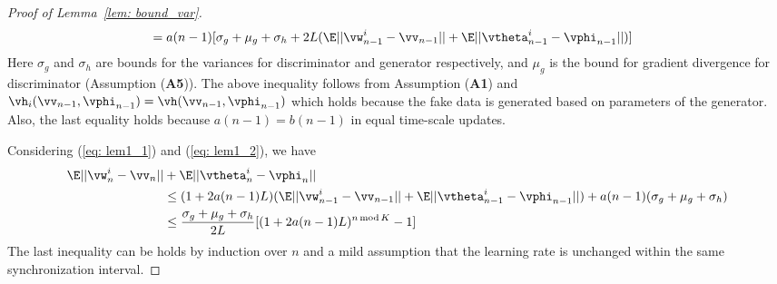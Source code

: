 \documentclass{article}
\def\lemref#1{Lemma~\ref{#1}}
\begin{document}
\begin{proof}	[Proof of \lemref{lem: bound_var}]
\begin{equation}
\begin{split}
		&=a(n-1)[\sigma_g+\mu_g+\sigma_h+ 2L(\E||\vw^i_{n-1}-\vv_{n-1}|| + \E||\vtheta^i_{n-1}-\vphi_{n-1}||)]
		\end{split}
		\end{equation}	
		Here $\sigma_g$ and $\sigma_h$ are bounds for the variances for discriminator and generator respectively, and $\mu_g$ is the bound for gradient divergence for discriminator (Assumption (\textbf{A5})). The above inequality follows from Assumption (\textbf{A1}) and  $\vh_i(\vv_{n-1},\vphi_{n-1})=\vh(\vv_{n-1},\vphi_{n-1})$ which holds because the fake data is generated based on parameters of the generator. Also, the last equality holds because $a(n-1)=b(n-1)$ in equal time-scale updates.
		
		Considering (\ref{eq: lem1_1}) and (\ref{eq: lem1_2}), we have
		\begin{equation}
		\begin{split}
		\E ||\vw^i_n-\vv_n||&+\E||\vtheta^i_n-\vphi_n||\\
		&\leq (1+2a(n-1)L)(\E||\vw^i_{n-1}-\vv_{n-1}|| + \E||\vtheta^i_{n-1}-\vphi_{n-1}||)+a(n-1)(\sigma_g+\mu_g+\sigma_h)\\
		&\leq \frac{\sigma_g+\mu_g+\sigma_h}{2L}[(1+2a(n-1)L)^{n\, \text{mod}\, K}-1]
		\end{split}
		\end{equation}
		The last inequality can be holds by induction over $n$ and a mild assumption that the learning rate is unchanged within the same synchronization interval. 
	\end{proof}
\end{document}
